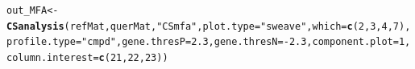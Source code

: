\documentclass[a4paper]{article}\usepackage[]{graphicx}\usepackage[]{color}
\makeatletter
\newcommand{\hlnum}[1]{\textcolor[rgb]{0.686,0.059,0.569}{#1}}%
\newcommand{\hlstr}[1]{\textcolor[rgb]{0.192,0.494,0.8}{#1}}%
\newcommand{\hlopt}[1]{\textcolor[rgb]{0,0,0}{#1}}%
\newcommand{\hlstd}[1]{\textcolor[rgb]{0.345,0.345,0.345}{#1}}%
\newcommand{\hlkwb}[1]{\textcolor[rgb]{0.69,0.353,0.396}{#1}}%
\newcommand{\hlkwc}[1]{\textcolor[rgb]{0.333,0.667,0.333}{#1}}%
\newcommand{\hlkwd}[1]{\textcolor[rgb]{0.737,0.353,0.396}{\textbf{#1}}}%
\newenvironment{kframe}{%
 \def\at@end@of@kframe{}%
 \ifinner\ifhmode%
  \def\at@end@of@kframe{\end{minipage}}%
  \begin{minipage}{\columnwidth}%
 \fi\fi%
 \def\FrameCommand##1{\hskip\@totalleftmargin \hskip-\fboxsep
 \colorbox{shadecolor}{##1}\hskip-\fboxsep
     \hskip-\linewidth \hskip-\@totalleftmargin \hskip\columnwidth}%
 \MakeFramed {\advance\hsize-\width
   \@totalleftmargin\z@ \linewidth\hsize
   \@setminipage}}%
 {\par\unskip\endMakeFramed%
 \at@end@of@kframe}
\newenvironment{knitrout}{}{} %
\makeatother
\begin{document}
\begin{knitrout}
\color{fgcolor}\begin{kframe}
\begin{alltt}
\hlstd{out_MFA} \hlkwb{<-} \hlkwd{CSanalysis}\hlstd{(refMat,querMat,}\hlstr{"CSmfa"}\hlstd{,}\hlkwc{plot.type}\hlstd{=}\hlstr{"sweave"}\hlstd{,}\hlkwc{which}\hlstd{=}\hlkwd{c}\hlstd{(}\hlnum{2}\hlstd{,}\hlnum{3}\hlstd{,}\hlnum{4}\hlstd{,}\hlnum{7}\hlstd{),}
                \hlkwc{profile.type}\hlstd{=}\hlstr{"cmpd"}\hlstd{,}\hlkwc{gene.thresP}\hlstd{=}\hlnum{2.3}\hlstd{,}\hlkwc{gene.thresN}\hlstd{=}\hlopt{-}\hlnum{2.3}\hlstd{,}\hlkwc{component.plot}\hlstd{=}\hlnum{1}\hlstd{,}
                \hlkwc{column.interest}\hlstd{=}\hlkwd{c}\hlstd{(}\hlnum{21}\hlstd{,}\hlnum{22}\hlstd{,}\hlnum{23}\hlstd{))}
\end{alltt}
\end{kframe}\begin{figure}[H]



\end{figure}
\end{knitrout}
\end{document}
